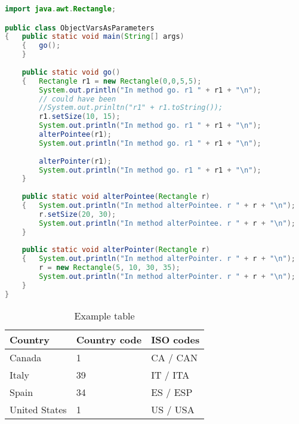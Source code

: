 \begin{lstlisting}[language=Java, caption=Java example, float, label=code:example]
import java.awt.Rectangle;

public class ObjectVarsAsParameters
{	public static void main(String[] args)
    {	go();
    }
    
    public static void go()
    {	Rectangle r1 = new Rectangle(0,0,5,5);
        System.out.println("In method go. r1 " + r1 + "\n");
        // could have been 
        //System.out.prinltn("r1" + r1.toString());
        r1.setSize(10, 15);
        System.out.println("In method go. r1 " + r1 + "\n");
        alterPointee(r1);
        System.out.println("In method go. r1 " + r1 + "\n");
        
        alterPointer(r1);
        System.out.println("In method go. r1 " + r1 + "\n");
    }
    
    public static void alterPointee(Rectangle r)
    {	System.out.println("In method alterPointee. r " + r + "\n");
        r.setSize(20, 30);
        System.out.println("In method alterPointee. r " + r + "\n");
    }
    
    public static void alterPointer(Rectangle r)
    {	System.out.println("In method alterPointer. r " + r + "\n");
        r = new Rectangle(5, 10, 30, 35);
        System.out.println("In method alterPointer. r " + r + "\n");
    }
}
\end{lstlisting}

\begin{table}[tbp]
\centering
\caption{Example table}
\label{tab:example}
\begin{tabular}{@{}lll@{}}
\toprule
Country       & Country code & ISO codes \\ \midrule
Canada        & 1            & CA / CAN  \\
Italy         & 39           & IT / ITA  \\
Spain         & 34           & ES / ESP  \\
United States & 1            & US / USA  \\ \bottomrule
\end{tabular}
\end{table}

